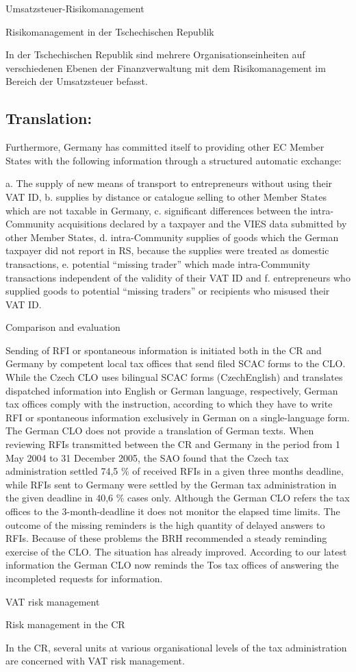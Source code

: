 \documentclass[10pt]{article}
\begin{document}
Umsatzsteuer-Risikomanagement



Risikomanagement in der Tschechischen Republik

In der Tschechischen Republik sind mehrere Organisationseinheiten auf verschiedenen Ebenen der Finanzverwaltung mit dem Risikomanagement im Bereich der Umsatzsteuer befasst.


\pagebreak

\subsection*{Translation:}



Furthermore, Germany has committed itself to providing other EC Member States with the following information through a structured automatic exchange:

a. The supply of new means of transport to entrepreneurs without using their VAT ID, b. supplies by distance or catalogue selling to other Member States which are not taxable in Germany, c. significant differences between the intra-Community acquisitions declared by a taxpayer and the VIES data submitted by other Member States, d. intra-Community supplies of goods which the German taxpayer did not report in RS, because the supplies were treated as domestic transactions, e. potential “missing trader” which made intra-Community transactions independent of the validity of their VAT ID and f. entrepreneurs who supplied goods to potential “missing traders” or recipients who misused their VAT ID.


Comparison and evaluation

Sending of RFI or spontaneous information is initiated both in the CR and Germany by competent local tax offices that send filed SCAC forms to the CLO.
While the Czech CLO uses bilingual SCAC forms (CzechEnglish) and translates dispatched information into English or German language, respectively, German tax offices comply with the instruction, according to which they have to write RFI or spontaneous information exclusively in German on a single-language form.
The German CLO does not provide a translation of German texts.
When reviewing RFIs transmitted between the CR and Germany in the period from 1 May 2004 to 31 December 2005, the SAO found that the Czech tax administration settled 74,5 \% of received RFIs in a given three months deadline, while RFIs sent to Germany were settled by the German tax administration in the given deadline in 40,6 \% cases only.
Although the German CLO refers the tax offices to the 3-month-deadline it does not monitor the elapsed time limits.
The outcome of the missing reminders is the high quantity of delayed answers to RFIs.
Because of these problems the BRH recommended a steady reminding exercise of the CLO.
The situation has already improved.
According to our latest information the German CLO now reminds the Tos tax offices of answering the incompleted requests for information.


VAT risk management



Risk management in the CR

In the CR, several units at various organisational levels of the tax administration are concerned with VAT risk management.
\end{document}
